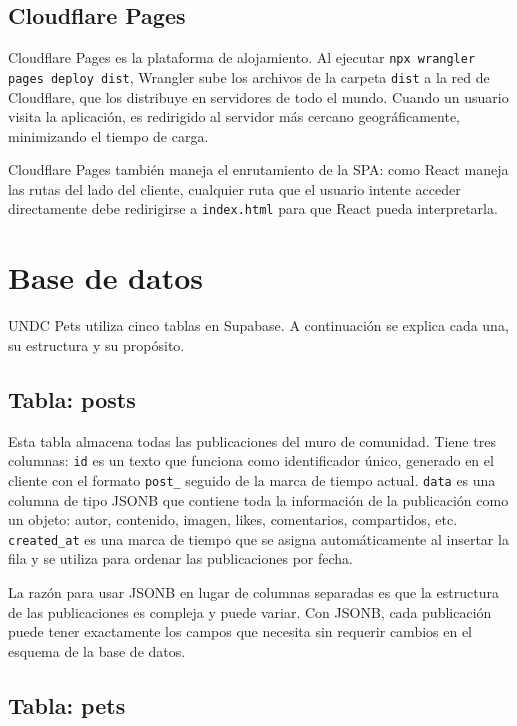 \documentclass[12pt,a4paper]{article}
\begin{document}
\subsection{Cloudflare Pages}

Cloudflare Pages es la plataforma de alojamiento. Al ejecutar \texttt{npx wrangler pages deploy dist}, Wrangler sube los archivos de la carpeta \texttt{dist} a la red de Cloudflare, que los distribuye en servidores de todo el mundo. Cuando un usuario visita la aplicación, es redirigido al servidor más cercano geográficamente, minimizando el tiempo de carga.

Cloudflare Pages también maneja el enrutamiento de la SPA: como React maneja las rutas del lado del cliente, cualquier ruta que el usuario intente acceder directamente debe redirigirse a \texttt{index.html} para que React pueda interpretarla.

\section{Base de datos}

UNDC Pets utiliza cinco tablas en Supabase. A continuación se explica cada una, su estructura y su propósito.

\subsection{Tabla: posts}

Esta tabla almacena todas las publicaciones del muro de comunidad. Tiene tres columnas: \texttt{id} es un texto que funciona como identificador único, generado en el cliente con el formato \texttt{post\_} seguido de la marca de tiempo actual. \texttt{data} es una columna de tipo JSONB que contiene toda la información de la publicación como un objeto: autor, contenido, imagen, likes, comentarios, compartidos, etc. \texttt{created\_at} es una marca de tiempo que se asigna automáticamente al insertar la fila y se utiliza para ordenar las publicaciones por fecha.

La razón para usar JSONB en lugar de columnas separadas es que la estructura de las publicaciones es compleja y puede variar. Con JSONB, cada publicación puede tener exactamente los campos que necesita sin requerir cambios en el esquema de la base de datos.

\subsection{Tabla: pets}
\end{document}
